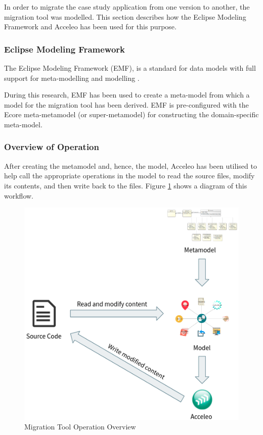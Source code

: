 \documentclass[conference]{IEEEtran}
\begin{document}
In order to migrate the case study application from one version to another, the migration tool was modelled. This section describes how the Eclipse Modeling Framework and Acceleo has been used for this purpose.

\subsubsection*{Eclipse Modeling Framework}

The Eclipse Modeling Framework (EMF), is a standard for data models with full support for meta-modelling and modelling \cite{b11}.

During this research, EMF has been used to create a meta-model from which a model for the migration tool has been derived. EMF is pre-configured with the Ecore meta-metamodel (or super-metamodel) for constructing the domain-specific meta-model.

\subsubsection*{Overview of Operation}

After creating the metamodel and, hence, the model, Acceleo has been utilised to help call the appropriate operations in the model to read the source files, modify its contents, and then write back to the files. Figure \ref{fig:operation} shows a diagram of this workflow.

\begin{figure}[htbp]
\centerline{\includegraphics[width=\linewidth,keepaspectratio]{workflow.png}}
\caption{Migration Tool Operation Overview}
\label{fig:operation}
\end{figure}
\end{document}

